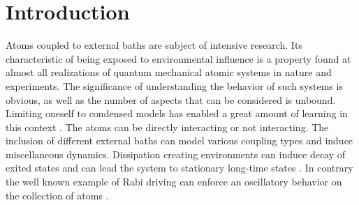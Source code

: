 \chapter{Introduction}
Atoms coupled to external baths are subject of intensive research. Its characteristic of being exposed to environmental influence is a property found at almost all realizations of quantum mechanical atomic systems in nature and experiments. The significance of understanding the behavior of such systems is obvious, as well as the number of aspects that can be considered is unbound. Limiting oneself to condensed models has enabled a great amount of learning in this context \cite{diehl_quantum_2008,diehl_dynamical_2010,cabot_metastable_2022,mattes_entangled_2023,krishna_measurement-induced_2023,jin_photon_2013,marcuzzi_absorbing_2016}. The atoms can be directly interacting or not interacting. The inclusion of different external baths can model various coupling types and induce miscellaneous dynamics. Dissipation creating environments can induce decay of exited states and can lead the system to stationary long-time states \cite{camalet_non-equilibrium_2011,huangfu_steady_2018}. In contrary the well known example of Rabi driving \cite{rabi_space_1937} can enforce an oscillatory behavior on the collection of atoms \cite{dudin_observation_2012}.

